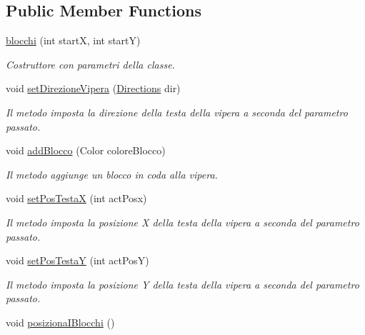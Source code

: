 \subsection*{Public Member Functions}
\begin{DoxyCompactItemize}
\item 
\mbox{\hyperlink{class_snake_1_1game_1_1vipera_1_1blocchi_af15f919c8bd034fb2f61735594958357}{blocchi}} (int startX, int startY)
\begin{DoxyCompactList}\small\item\em Costruttore con parametri della classe. \end{DoxyCompactList}\item 
void \mbox{\hyperlink{class_snake_1_1game_1_1vipera_1_1blocchi_a6007259ace9d33bd56b9a6193e86df39}{set\+Direzione\+Vipera}} (\mbox{\hyperlink{enum_snake_1_1game_1_1utility_1_1_directions}{Directions}} dir)
\begin{DoxyCompactList}\small\item\em Il metodo imposta la direzione della testa della vipera a seconda del parametro passato. \end{DoxyCompactList}\item 
void \mbox{\hyperlink{class_snake_1_1game_1_1vipera_1_1blocchi_aca08d818f8eb2849ca337ea2c64f344d}{add\+Blocco}} (Color colore\+Blocco)
\begin{DoxyCompactList}\small\item\em Il metodo aggiunge un blocco in coda alla vipera. \end{DoxyCompactList}\item 
void \mbox{\hyperlink{class_snake_1_1game_1_1vipera_1_1blocchi_a1e26556cba7802de510ce21bc9096149}{set\+Pos\+TestaX}} (int act\+Posx)
\begin{DoxyCompactList}\small\item\em Il metodo imposta la posizione X della testa della vipera a seconda del parametro passato. \end{DoxyCompactList}\item 
void \mbox{\hyperlink{class_snake_1_1game_1_1vipera_1_1blocchi_a7136da8bd75e6d0622eecf38aea1b60e}{set\+Pos\+TestaY}} (int act\+PosY)
\begin{DoxyCompactList}\small\item\em Il metodo imposta la posizione Y della testa della vipera a seconda del parametro passato. \end{DoxyCompactList}\item 
void \mbox{\hyperlink{class_snake_1_1game_1_1vipera_1_1blocchi_a2fbeb7ff9ae1fc1f5c5b1a885900034c}{posiziona\+I\+Blocchi}} ()

\end{DoxyCompactItemize}
